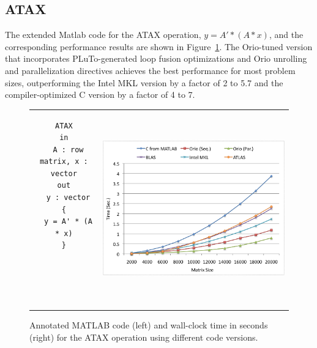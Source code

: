 \documentclass[11pt]{article}
\begin{document}
\subsection{ATAX}

The extended Matlab code for the ATAX operation, $y = A' * (A * x)$, and the corresponding performance results are shown in Figure~\ref{fig:atax}. The Orio-tuned version that incorporates PLuTo-generated loop fusion optimizations and Orio unrolling and parallelization directives achieves the best performance for most problem sizes, outperforming the Intel MKL version by a factor of 2 to 5.7 and the compiler-optimized C version by a factor of 4 to 7.



\begin{figure}[htp]
\centering
\begin{tabular}{cc}
\begin{minipage}[b]{.3\textwidth}
\footnotesize
\begin{verbatim}
ATAX
in
  A : row matrix, x : vector
out
  y : vector
{
  y = A' * (A * x)
}





\end{verbatim}
\end{minipage}
&
\begin{minipage}[b]{.6\textwidth}
\includegraphics[width=\textwidth]{figures/atax.png}
\end{minipage}\\
\end{tabular}
\caption{Annotated MATLAB code (left) and wall-clock time in seconds (right) for the ATAX operation using different code versions.}
\label{fig:atax}
\end{figure}
\end{document}

